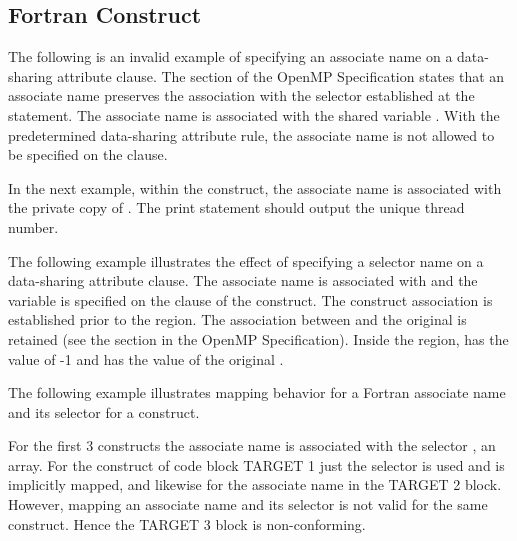 \begin{fortranspecific}[4ex]
\section{Fortran  Construct}
\label{sec:associate}

The following is an invalid example of specifying an associate name on a data-sharing attribute 
clause. The  section of the OpenMP
Specification states that an associate name preserves the association
with the selector established at the  statement. The associate 
name  is associated with the shared variable . With the predetermined data-sharing 
attribute rule, the associate name  is not allowed to be specified on the  
clause.

{}

In the next example, within the  construct, the associate name  
is associated with the private copy of . The print statement should output the 
unique thread number.


The following example illustrates the effect of specifying a selector name on a data-sharing 
attribute clause. The associate name  is associated with  and the variable  
is specified on the  clause of the  construct. 
The construct association is established prior to the  region. 
The association between  and the original  is retained (see the  section in the OpenMP Specification). Inside the 
region,  has the value of -1 and  has the value of the original .


\label{sec:associate_target}

\bigskip
The following example illustrates mapping behavior for a Fortran
associate name and its selector for a  construct.

For the first 3  constructs the associate name  is
associated with the selector , an array.  
For the  construct of code block TARGET 1 just the selector
 is used and is implicitly mapped,
and likewise for the associate name  in the TARGET 2 block.
However, mapping an associate name and its selector is not valid for the same
 construct.  Hence the TARGET 3 block is non-conforming.



\end{fortranspecific}
